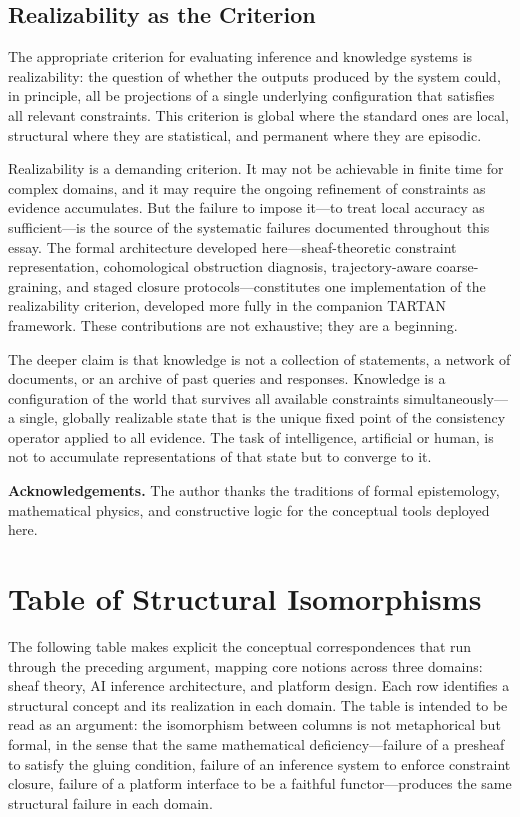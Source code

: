 \documentclass[12pt, oneside]{article}
\begin{document}
\subsection{Realizability as the Criterion}

The appropriate criterion for evaluating inference and knowledge systems is realizability: the question of whether the outputs produced by the system could, in principle, all be projections of a single underlying configuration that satisfies all relevant constraints. This criterion is global where the standard ones are local, structural where they are statistical, and permanent where they are episodic.

Realizability is a demanding criterion. It may not be achievable in finite time for complex domains, and it may require the ongoing refinement of constraints as evidence accumulates. But the failure to impose it---to treat local accuracy as sufficient---is the source of the systematic failures documented throughout this essay. The formal architecture developed here---sheaf-theoretic constraint representation, cohomological obstruction diagnosis, trajectory-aware coarse-graining, and staged closure protocols---constitutes one implementation of the realizability criterion, developed more fully in the companion TARTAN framework. These contributions are not exhaustive; they are a beginning.

The deeper claim is that knowledge is not a collection of statements, a network of documents, or an archive of past queries and responses. Knowledge is a configuration of the world that survives all available constraints simultaneously---a single, globally realizable state that is the unique fixed point of the consistency operator applied to all evidence. The task of intelligence, artificial or human, is not to accumulate representations of that state but to converge to it.

\bigskip

\noindent\textbf{Acknowledgements.} The author thanks the traditions of formal epistemology, mathematical physics, and constructive logic for the conceptual tools deployed here.

\newpage
\appendix

\section{Table of Structural Isomorphisms}

The following table makes explicit the conceptual correspondences that run through the preceding argument, mapping core notions across three domains: sheaf theory, AI inference architecture, and platform design. Each row identifies a structural concept and its realization in each domain. The table is intended to be read as an argument: the isomorphism between columns is not metaphorical but formal, in the sense that the same mathematical deficiency---failure of a presheaf to satisfy the gluing condition, failure of an inference system to enforce constraint closure, failure of a platform interface to be a faithful functor---produces the same structural failure in each domain.
\end{document}
